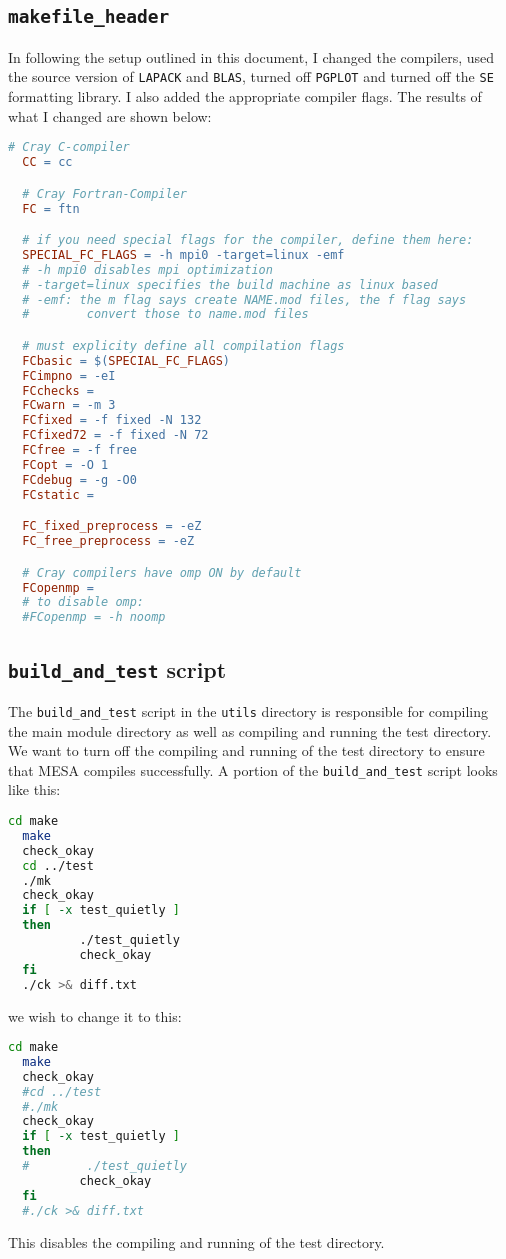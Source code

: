 \subsection{{\tt makefile\_header}}
In following the setup outlined in this document, I changed the compilers, 
used the source version of {\tt LAPACK} and {\tt BLAS}, turned off 
{\tt PGPLOT} and turned off the {\tt SE} formatting library. I also added the 
appropriate compiler flags. The results of what I changed are shown below:
\begin{lstlisting}[language=make,mathescape=false]
  # Cray C-compiler
  CC = cc

  # Cray Fortran-Compiler
  FC = ftn

  # if you need special flags for the compiler, define them here:
  SPECIAL_FC_FLAGS = -h mpi0 -target=linux -emf
  # -h mpi0 disables mpi optimization
  # -target=linux specifies the build machine as linux based
  # -emf: the m flag says create NAME.mod files, the f flag says
  #        convert those to name.mod files

  # must explicity define all compilation flags
  FCbasic = $(SPECIAL_FC_FLAGS)
  FCimpno = -eI
  FCchecks =
  FCwarn = -m 3
  FCfixed = -f fixed -N 132
  FCfixed72 = -f fixed -N 72
  FCfree = -f free
  FCopt = -O 1
  FCdebug = -g -O0
  FCstatic =

  FC_fixed_preprocess = -eZ
  FC_free_preprocess = -eZ

  # Cray compilers have omp ON by default
  FCopenmp =
  # to disable omp:
  #FCopenmp = -h noomp 
\end{lstlisting}

\subsection{{\tt build\_and\_test} script}

The {\tt build\_and\_test} script in the {\tt utils} directory is 
responsible for compiling the main module directory as well as compiling 
and running the test directory. We want to turn off the compiling and 
running of the test directory to ensure that {\sf MESA} compiles successfully. 
A portion of the {\tt build\_and\_test} script looks like this:
\begin{lstlisting}[language=bash,mathescape=false]
  cd make
  make
  check_okay
  cd ../test
  ./mk
  check_okay
  if [ -x test_quietly ]
  then
          ./test_quietly
          check_okay
  fi
  ./ck >& diff.txt
\end{lstlisting}
we wish to change it to this:
\begin{lstlisting}[language=bash,mathescape=false]
  cd make
  make
  check_okay
  #cd ../test
  #./mk
  check_okay
  if [ -x test_quietly ]
  then
  #        ./test_quietly
          check_okay
  fi
  #./ck >& diff.txt
\end{lstlisting}
This disables the compiling and running of the test directory.



